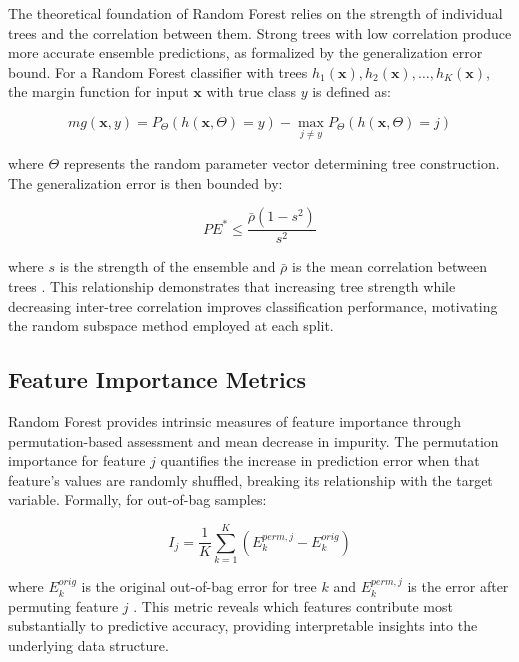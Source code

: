 \documentclass[conference]{IEEEtran}
\begin{document}
The theoretical foundation of Random Forest relies on the strength of individual trees and the correlation between them. Strong trees with low correlation produce more accurate ensemble predictions, as formalized by the generalization error bound. For a Random Forest classifier with trees $h_1(\mathbf{x}), h_2(\mathbf{x}), \ldots, h_K(\mathbf{x})$, the margin function for input $\mathbf{x}$ with true class $y$ is defined as:

\begin{equation}
mg(\mathbf{x}, y) = P_\Theta(h(\mathbf{x}, \Theta) = y) - \max_{j \neq y} P_\Theta(h(\mathbf{x}, \Theta) = j)
\end{equation}

where $\Theta$ represents the random parameter vector determining tree construction. The generalization error is then bounded by:

\begin{equation}
PE^* \leq \frac{\bar{\rho}(1-s^2)}{s^2}
\end{equation}

where $s$ is the strength of the ensemble and $\bar{\rho}$ is the mean correlation between trees \cite{breiman2001random}. This relationship demonstrates that increasing tree strength while decreasing inter-tree correlation improves classification performance, motivating the random subspace method employed at each split.

\subsection{Feature Importance Metrics}

Random Forest provides intrinsic measures of feature importance through permutation-based assessment and mean decrease in impurity. The permutation importance for feature $j$ quantifies the increase in prediction error when that feature's values are randomly shuffled, breaking its relationship with the target variable. Formally, for out-of-bag samples:

\begin{equation}
I_j = \frac{1}{K} \sum_{k=1}^{K} \left( E_k^{perm,j} - E_k^{orig} \right)
\end{equation}

where $E_k^{orig}$ is the original out-of-bag error for tree $k$ and $E_k^{perm,j}$ is the error after permuting feature $j$ \cite{strobl2007bias}. This metric reveals which features contribute most substantially to predictive accuracy, providing interpretable insights into the underlying data structure.
\end{document}
